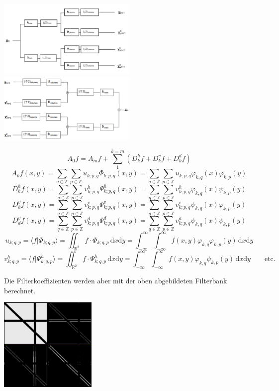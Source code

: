 \includegraphics[width=0.5\textwidth]{content/Wavelet2DDec.pdf}	
\includegraphics[width=0.5\textwidth]{content/Wavelet2DRec.pdf}

	\[  
		A_0f = A_mf+\sum_{1}^{k=m}(D_k^hf+D_k^vf+D_k^df)
	\]
	\[  
		A_kf(x,y)=\sum_{q\in\mathbb{Z}}\sum_{p\in \mathbb{Z}}u_{k;p,q}\Phi_{k;p,q}(x,y) = \sum_{q\in\mathbb{Z}}\sum_{p\in \mathbb{Z}}u_{k;p,q} \varphi_{k,q}(x) \varphi_{k,p}(y)
	\]
	\[  
		D_k^hf(x,y)=\sum_{q\in\mathbb{Z}}\sum_{p\in \mathbb{Z}}v_{k;p,q}^h\Psi_{k;p,q}^h(x,y) = \sum_{q\in\mathbb{Z}}\sum_{p\in \mathbb{Z}}v_{k;p,q}^h \varphi_{k,q}(x) \psi_{k,p}(y)
	\]
	\[  
		D_k^vf(x,y)=\sum_{q\in\mathbb{Z}}\sum_{p\in \mathbb{Z}}v_{k;p,q}^v\Psi_{k;p,q}^v(x,y) = \sum_{q\in\mathbb{Z}}\sum_{p\in \mathbb{Z}}v_{k;p,q}^v \psi_{k,q}(x) \varphi_{k,p}(y)
	\]
	\[  
		D_d^vf(x,y)=\sum_{q\in\mathbb{Z}}\sum_{p\in \mathbb{Z}}v_{k;p,q}^d\Psi_{k;p,q}^d(x,y) = \sum_{q\in\mathbb{Z}}\sum_{p\in \mathbb{Z}}v_{k;p,q}^d \psi_{k,q}(x) \psi_{k,p}(y)
	\]		
\[ 
	u_{k;q,p}=\langle f|\Phi_{k;q,p} \rangle = \iint_{\mathbb{R}^2} f \cdot \Phi_{k;q,p} \, \mathrm{d}x\mathrm{d}y = \int_{-\infty}^{\infty} \int_{-\infty}^{\infty} f(x,y) \varphi_{k,q} \varphi_{k,p}(y) \, \mathrm{d}x\mathrm{d}y 
\]
\[
	v_{k;q,p}^h=\langle f|\Psi_{k;q,p}^h \rangle = \iint_{\mathbb{R}^2} f \cdot \Psi_{k;q,p}^h \, \mathrm{d}x\mathrm{d}y = \int_{-\infty}^{\infty} \int_{-\infty}^{\infty} f(x,y) \varphi_{k,q} \psi_{k,p}(y) \, \mathrm{d}x\mathrm{d}y \qquad \text{etc.}
\]

Die Filterkoeffizienten werden aber mit der oben abgebildeten Filterbank berechnet.

\begin{center}
	\includegraphics[width=0.35\textwidth]{content/waveBsp2D.png}
\end{center}




